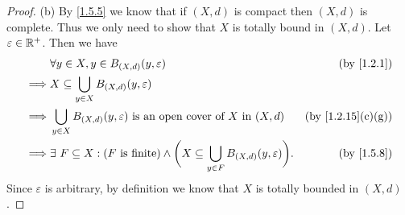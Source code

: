 \begin{proof}{(b)}
  By \cref{1.5.5} we know that if \((X, d)\) is compact then \((X, d)\) is complete.
  Thus we only need to show that \(X\) is totally bound in \((X, d)\).
  Let \(\varepsilon \in \mathbb{R}^+\).
  Then we have
  \begin{align*}
             & \forall y \in X, y \in B_{(X, d)}(y, \varepsilon)                                                                          & \text{(by \cref{1.2.1})}        \\
    \implies & X \subseteq \bigcup_{y \in X} B_{(X, d)}(y, \varepsilon)                                                                                                     \\
    \implies & \bigcup_{y \in X} B_{(X, d)}(y, \varepsilon) \text{ is an open cover of } X \text{ in } (X, d)                             & \text{(by \cref{1.2.15}(c)(g))} \\
    \implies & \exists\ F \subseteq X : (F \text{ is finite}) \land \bigg(X \subseteq \bigcup_{y \in F} B_{(X, d)}(y, \varepsilon)\bigg). & \text{(by \cref{1.5.8})}
  \end{align*}
  Since \(\varepsilon\) is arbitrary, by definition we know that \(X\) is totally bounded in \((X, d)\).
\end{proof}

